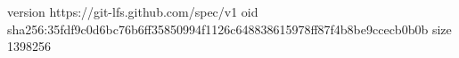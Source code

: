 version https://git-lfs.github.com/spec/v1
oid sha256:35fdf9c0d6bc76b6ff35850994f1126c648838615978ff87f4b8be9ccecb0b0b
size 1398256
